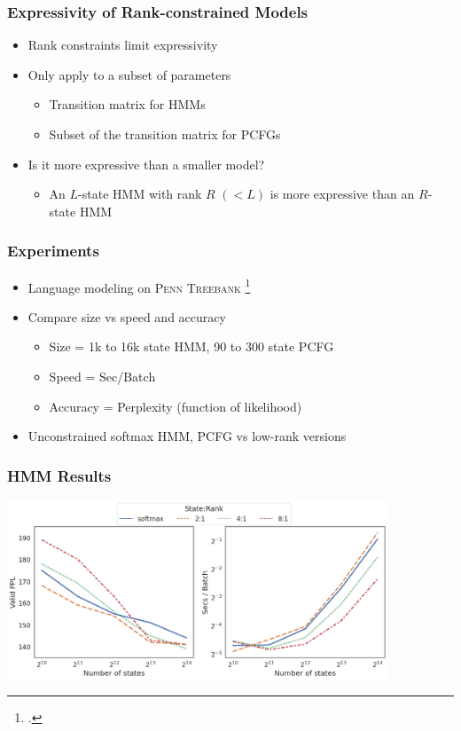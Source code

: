 \documentclass{beamer}
\begin{document}
\begin{frame}
\frametitle{Expressivity of Rank-constrained Models}
\begin{itemize}
\item Rank constraints limit expressivity
\vspace{1em}
\item Only apply to a subset of parameters
    \begin{itemize}
    \item Transition matrix for HMMs
    \item Subset of the transition matrix for PCFGs
    \end{itemize}
\vspace{1em}
\item Is it more expressive than a smaller model?
    \begin{itemize}
    \item An $L$-state HMM with rank $R$ $(< L)$ is more
        expressive than an $R$-state HMM
    \end{itemize}
\end{itemize}
\end{frame}

\begin{frame}
\frametitle{Experiments}
\begin{itemize}
\item Language modeling on \textsc{Penn Treebank} \footcite{ptb}
\vspace{1em}
\item Compare size vs speed and accuracy
    \begin{itemize}
    \item Size = 1k to 16k state HMM, 90 to 300 state PCFG
    \item Speed = Sec/Batch
    \item Accuracy = Perplexity (function of likelihood)
    \end{itemize}
\vspace{1em}
\item Unconstrained softmax HMM, PCFG vs low-rank versions %
\end{itemize}
\end{frame}

\begin{frame}
\frametitle{HMM Results}
\centering
\includegraphics[height=2.1in]{imgs/hmm/lhmm-speed-acc-joint.png}
\end{frame}
\end{document}
